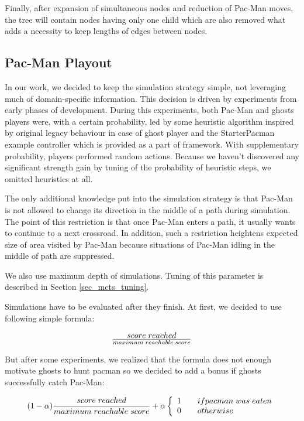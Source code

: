 Finally, after expansion of simultaneous nodes and reduction of Pac-Man moves, the tree
will contain nodes having only one child which are also removed what adds a necessity to keep
lengths of edges between nodes.


\subsection{Pac-Man Playout}
\label{sec_impl_playout}

In our work, we decided to keep the simulation strategy simple, not leveraging much of
domain-specific information. This decision is driven by experiments from early phases of
development. During this experiments, both Pac-Man and ghosts players were, with a certain
probability, led by some heuristic algorithm inspired by original legacy behaviour in case of
ghost player and the StarterPacman example controller which is provided as a part of framework.
With supplementary probability, players performed random actions. Because we haven't discovered
any significant strength gain by tuning of the probability of heuristic steps, we omitted
heuristics at all.

The only additional knowledge put into the simulation strategy is that Pac-Man is not allowed
to change its direction in the middle of a path during simulation. The point of this 
restriction is that once Pac-Man enters a path, it usually wants to continue to a next
crossroad. In addition, such a restriction heightens expected size of area visited by Pac-Man
because situations of Pac-Man idling in the middle of path are suppressed.

We also use maximum depth of simulations. Tuning of this parameter is described in Section
\ref{sec_mcts_tuning}.

Simulations have to be evaluated after they finish. At first, we decided to use following
simple formula:

\begin{equation}
    { score\;reached } \over { maximum\;reachable\;score }
\end{equation}

But after some experiments, we realized that the formula does not enough motivate ghosts to
hunt pacman so we decided to add a bonus if ghosts successfully catch Pac-Man:

\begin{equation}
    (1 - \alpha) {{ score\;reached } \over { maximum\;reachable\;score }}
        + \alpha 
    \left\{
        \begin{array}{c@{\quad\quad}l}
            1 & if pacman\;was\;eaten\\
            0 & otherwise\\
        \end{array}
    \right.
\end{equation}

